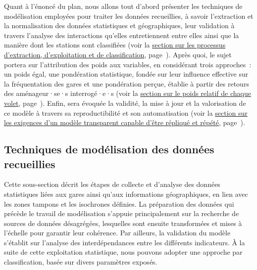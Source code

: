 \begin{refsegment}
Quant à l'énoncé du plan, nous allons tout d’abord présenter les techniques de modélisation employées pour traiter les données recueillies, à savoir l’extraction et la normalisation des données statistiques et géographiques, leur validation à travers l’analyse des interactions qu’elles entretiennent entre elles ainsi que la manière dont les stations sont classifiées (voir la \hyperref[chap6:methodologie-statistiques]{section sur les processus d'extraction, d'exploitation et de classification}, page~\pageref{chap6:methodologie-statistiques}). Après quoi, le sujet portera sur l’attribution des poids aux variables, en considérant trois approches~: un poids égal, une pondération statistique, fondée sur leur influence effective sur la fréquentation des gares et une pondération perçue, établie à partir des retours des aménageur·se·s interrogé·e·s (voir la \hyperref[chap6:methodologie-ponderation-indicateurs]{section sur le poids relatif de chaque volet}, page~\pageref{chap6:methodologie-ponderation-indicateurs}). Enfin, sera évoquée la validité, la mise à jour et la valorisation de ce modèle à travers sa reproductibilité et son automatisation (voir la \hyperref[chap6:conclusion-valorisation]{section sur les exigences d'un modèle transparent capable d'être répliqué et répété}, page~\pageref{chap6:conclusion-valorisation}).%

\subsection{Techniques de modélisation des données recueillies
    \label{chap6:methodologie-statistiques}
    }

Cette sous-section décrit les étapes de collecte et d'analyse des données statistiques liées aux gares ainsi qu'aux informations géographiques, en lien avec les zones tampons et les isochrones définies. La préparation des données qui précède le travail de modélisation s’appuie principalement sur la recherche de sources de données désagrégées, lesquelles sont ensuite transformées et mises à l’échelle pour garantir leur cohérence. Par ailleurs, la validation du modèle s'établit sur l’analyse des interdépendances entre les différents indicateurs. À la suite de cette exploitation statistique, nous pouvons adopter une approche par classification, basée sur divers paramètres exposés.%


\end{refsegment}
